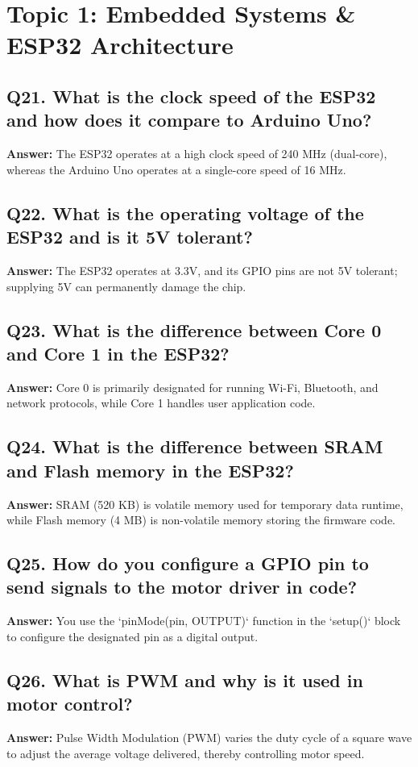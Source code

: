 \documentclass[12pt,a4paper,oneside]{report}
\begin{document}
\chapter{Topic 1: Embedded Systems \& ESP32 Architecture}

\section{Q21. What is the clock speed of the ESP32 and how does it compare to Arduino Uno?}
\textbf{Answer:} The ESP32 operates at a high clock speed of 240 MHz (dual-core), whereas the Arduino Uno operates at a single-core speed of 16 MHz.

\section{Q22. What is the operating voltage of the ESP32 and is it 5V tolerant?}
\textbf{Answer:} The ESP32 operates at 3.3V, and its GPIO pins are not 5V tolerant; supplying 5V can permanently damage the chip.

\section{Q23. What is the difference between Core 0 and Core 1 in the ESP32?}
\textbf{Answer:} Core 0 is primarily designated for running Wi-Fi, Bluetooth, and network protocols, while Core 1 handles user application code.

\section{Q24. What is the difference between SRAM and Flash memory in the ESP32?}
\textbf{Answer:} SRAM (520 KB) is volatile memory used for temporary data runtime, while Flash memory (4 MB) is non-volatile memory storing the firmware code.

\section{Q25. How do you configure a GPIO pin to send signals to the motor driver in code?}
\textbf{Answer:} You use the `pinMode(pin, OUTPUT)` function in the `setup()` block to configure the designated pin as a digital output.

\section{Q26. What is PWM and why is it used in motor control?}
\textbf{Answer:} Pulse Width Modulation (PWM) varies the duty cycle of a square wave to adjust the average voltage delivered, thereby controlling motor speed.
\end{document}
